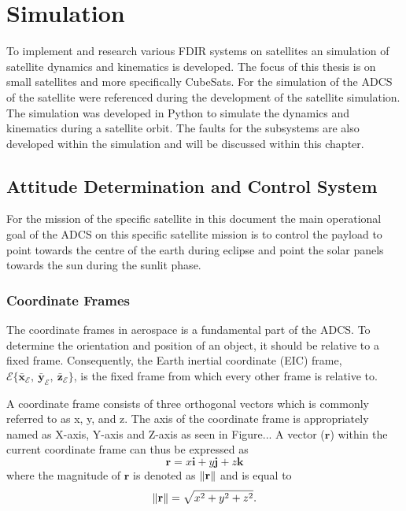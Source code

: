 \chapter{Simulation}
\label{chap:Simulation}

To implement and research various FDIR systems on satellites an simulation of satellite dynamics and kinematics is developed. The focus of this thesis is on small satellites and more specifically CubeSats. For the simulation of the ADCS of the satellite \cite{auret2012design, JansevanVuuren2015, Jordaan2016} were referenced during the development of the satellite simulation. The simulation was developed in Python to simulate the dynamics and kinematics during a satellite orbit. The faults for the subsystems are also developed within the simulation and will be discussed within this chapter.

\section{Attitude Determination and Control System}

For the mission of the specific satellite in this document the main operational goal of the ADCS on this specific satellite mission is to control the payload to point towards the centre of the earth during eclipse and point the solar panels towards the sun during the sunlit phase. 

\subsection{Coordinate Frames}
The coordinate frames in aerospace is a fundamental part of the ADCS. To determine the orientation and position of an object, it should be relative to a fixed frame. Consequently, the Earth inertial coordinate (EIC) frame, $\mathcal{E}\{\bar{\mathbf{x}}_{\mathcal{E}},~\bar{\mathbf{y}}_{\mathcal{E}},~\bar{\mathbf{z}}_{\mathcal{E}}\}$, is the fixed frame from which every other frame is relative to.

A coordinate frame consists of three orthogonal vectors which is commonly referred to as x, y, and z. The axis of the coordinate frame is appropriately named as X-axis, Y-axis and Z-axis as seen in Figure... A vector ($\mathbf{r}$) within the current coordinate frame can thus be expressed as 
\begin{equation}
\mathbf{r} = x\mathbf{i} + y\mathbf{j} + z\mathbf{k}
\end{equation}
where the magnitude of $\mathbf{r}$ is denoted as $\left\lVert\mathbf{r}\right\rVert$ and is equal to 
\begin{equation}
\left\lVert\mathbf{r}\right\rVert = \sqrt{x^2 + y^2 + z^2}.
\end{equation}

